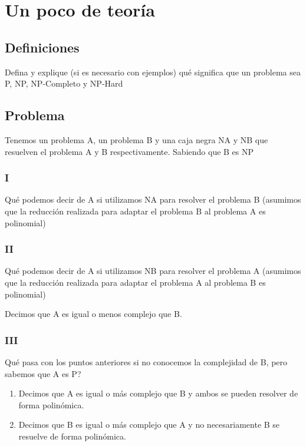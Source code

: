 \section{Un poco de teoría}
\subsection{Definiciones}
Defina y explique (si es necesario con ejemplos) qué significa que un problema sea P, NP, NP-Completo y NP-Hard

\subsection{Problema}
Tenemos un problema A, un problema B y una caja negra NA y NB que resuelven el problema A y B respectivamente. Sabiendo que B es NP
\subsubsection{I}
Qué podemos decir de A si utilizamos NA para resolver el problema B (asumimos que la reducción realizada para adaptar el problema B al problema A es polinomial)
\subsubsection{II}
Qué podemos decir de A si utilizamos NB para resolver el problema A (asumimos que la reducción realizada para adaptar el problema A al problema B es polinomial)\newline

Decimos que A es igual o menos complejo que B.

\subsubsection{III}
Qué pasa con los puntos anteriores si no conocemos la complejidad de B, pero sabemos que A es P?

\begin{enumerate}
    \item Decimos que A es igual o más complejo que B y ambos se pueden resolver de forma polinómica.
    \item Decimos que B es igual o más complejo que A y no necesariamente B se resuelve de forma polinómica.
\end{enumerate}

